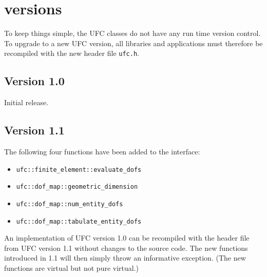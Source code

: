 \chapter{\ufc{} versions}
\label{app:versions}

To keep things simple, the UFC classes do not have any run time
version control. To upgrade to a new UFC version, all libraries and
applications must therefore be recompiled with the new header file
\texttt{ufc.h}.

\section{Version 1.0}
Initial release.

\section{Version 1.1}
The following four functions have been added to the interface:
\begin{itemize}
\item \texttt{ufc::finite\_element::evaluate\_dofs}
\item \texttt{ufc::dof\_map::geometric\_dimension}
\item \texttt{ufc::dof\_map::num\_entity\_dofs}
\item \texttt{ufc::dof\_map::tabulate\_entity\_dofs}
\end{itemize}

An implementation of UFC version 1.0 can be recompiled with the header
file from UFC version 1.1 without changes to the source code. The new
functions introduced in 1.1 will then simply throw an informative
exception. (The new functions are virtual but not pure virtual.)
